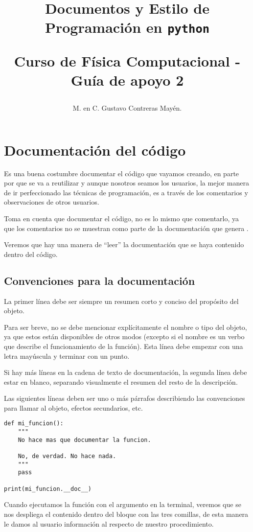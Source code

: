 
\title{Documentos y Estilo de Programación en \texttt{python} \\ \begin{Large}Curso de Física Computacional - Guía de apoyo 2 \end{Large}}
\author{M. en C. Gustavo Contreras Mayén.}


\maketitle
\fontsize{14}{14}\selectfont
\section{Documentación del código}
Es una buena costumbre documentar el código que vayamos creando, en parte por que se va a reutilizar y aunque nosotros seamos los usuarios, la mejor manera de ir perfeccionado las técnicas de programación, es a través de los comentarios y observaciones de otros usuarios.
\par
Toma en cuenta que documentar el código, no es lo mismo que comentarlo, ya que los comentarios no se muestran como parte de la documentación que genera \python.
\par
Veremos que hay una manera de \enquote{leer} la documentación que se haya contenido dentro del código.
\subsection{Convenciones para la documentación}
La primer línea debe ser siempre un resumen corto y conciso del propósito del objeto.
\par
Para ser breve, no se debe mencionar explícitamente el nombre o tipo del objeto, ya que estos están disponibles de otros modos (excepto si el nombre es un verbo que describe el funcionamiento de la función). Esta línea debe empezar con una letra mayúscula y terminar con un punto.
\par
Si hay más líneas en la cadena de texto de documentación, la segunda línea debe estar en blanco, separando visualmente el resumen del resto de la descripción.
\par
Las siguientes líneas deben ser uno o más párrafos describiendo las convenciones para llamar al objeto, efectos secundarios, etc.
\begin{lstlisting}[caption=Ejemplo de documentación, basicstyle=\linespread{1.2}, columns=fullflexible,escapeinside=||]  
def mi_funcion():
    """
    No hace mas que documentar la funcion.

    No, de verdad. No hace nada.
    """
    pass

print(mi_funcion.__doc__)
\end{lstlisting}
Cuando ejecutamos la función  con el argumento en la terminal, veremos que se nos despliega el contenido dentro del bloque con las tres comillas, de esta manera le damos al usuario información al respecto de nuestro procedimiento.
